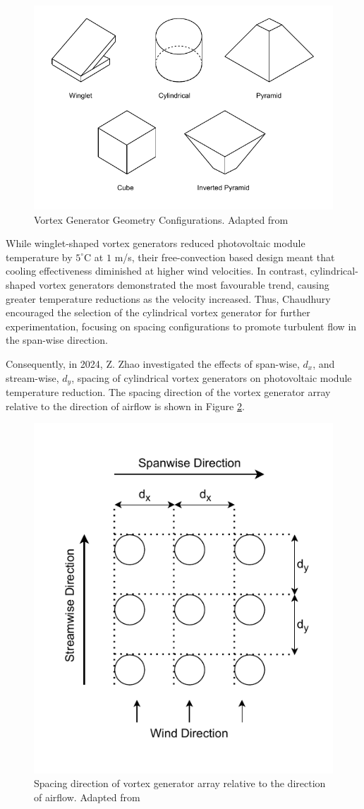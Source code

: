 \begin{figure}[ht]
    \centering
    \includegraphics[width=0.75\linewidth, trim=0 10 0 10, clip]{Figures/vortex_generator_shapes.pdf}
    \caption{Vortex Generator Geometry Configurations. Adapted from \cite{Chaudhury2024TheConvection}}
    \label{fig:vortex_generator_shapes}
\end{figure}

While winglet-shaped vortex generators reduced photovoltaic module temperature by $5^\circ \text{C}$ at $1$ m/s, their free-convection based design meant that cooling effectiveness diminished at higher wind velocities. In contrast, cylindrical-shaped vortex generators demonstrated the most favourable trend, causing greater temperature reductions as the velocity increased. Thus, Chaudhury encouraged the selection of the cylindrical vortex generator for further experimentation, focusing on spacing configurations to promote turbulent flow in the span-wise direction. \cite{Chaudhury2024TheConvection}

Consequently, in 2024, Z. Zhao investigated the effects of span-wise, $d_x$, and stream-wise, $d_y$, spacing of cylindrical vortex generators on photovoltaic module temperature reduction. The spacing direction of the vortex generator array relative to the direction of airflow is shown in Figure \ref{fig:spacing_diagram}.

\begin{figure}[H]
    \centering
    \includegraphics[width=0.5\linewidth, trim=0 10 0 10, clip]{Figures/spacing_diagram.pdf}
    \caption{Spacing direction of vortex generator array relative to the direction of airflow. Adapted from \cite{Zhou2024SpacingConvection}}
    \label{fig:spacing_diagram}
\end{figure}

